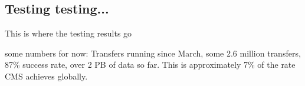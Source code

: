 \subsection{Testing testing...}
This is where the testing results go

some numbers for now: Transfers running since March, some 2.6 million transfers, 87\% success
rate, over 2 PB of data so far. This is approximately 7\% of the rate CMS achieves globally.



